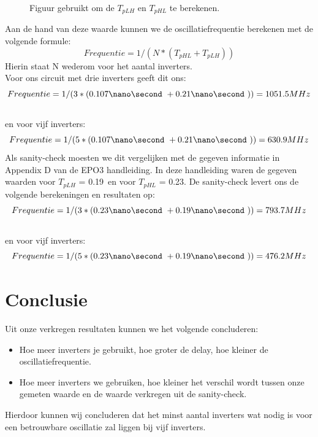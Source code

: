 \documentclass{scrartcl}  %
\begin{document}
\begin{figure}[H]
\centering
                \setlength{} 
                \setlength{}
                
                \caption{Figuur gebruikt om de $T_{pLH}$ en $T_{pHL}$ te berekenen.}
                \label{fig:tplhtphl5}
\end{figure}
Aan de hand van deze waarde kunnen we de oscillatiefrequentie berekenen met de volgende formule: 
\begin{equation}
Frequentie = 1/(N*(T_{pHL}+T_{pLH}))
\end{equation}
Hierin staat N wederom voor het aantal inverters. 
\\Voor ons circuit met drie inverters geeft dit ons: 
\begin{equation}
Frequentie = 1/(3*(0.107\nano\second\ + 0.21\nano\second\ )) = 1051.5 MHz
\end{equation} 
\\en voor vijf inverters:
\begin{equation}
Frequentie = 1/(5*(0.107\nano\second\ + 0.21\nano\second\ )) = 630.9 MHz
\end{equation} 
Als sanity-check moesten we dit vergelijken met de gegeven informatie in Appendix D van de EPO3 handleiding. In deze handleiding waren de gegeven waarden voor  $T_{pLH}$ =  0.19\nano\second\ en voor  $T_{pHL}$ = 0.23\nano\second .  De sanity-check levert ons de volgende berekeningen en resultaten op: 
\begin{equation}
Frequentie = 1/(3*(0.23\nano\second\ + 0.19\nano\second\ )) = 793.7 MHz
\end{equation} 
\\en voor vijf inverters:
\begin{equation}
Frequentie = 1/(5*(0.23\nano\second\ + 0.19\nano\second\ )) = 476.2 MHz
\end{equation} 

\section{Conclusie}
Uit onze verkregen resultaten kunnen we het volgende concluderen:
\begin{itemize}
	\item Hoe meer inverters je gebruikt, hoe groter de delay, hoe kleiner de oscillatiefrequentie.
	\item Hoe meer inverters we gebruiken, hoe kleiner het verschil wordt tussen onze gemeten waarde en de waarde verkregen uit de sanity-check.
\end{itemize}
Hierdoor kunnen wij concluderen dat het minst aantal inverters wat nodig is voor een betrouwbare oscillatie zal liggen bij vijf inverters. 
\end{document}
